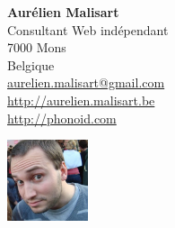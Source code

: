 \noindent\begin{minipage}[c]{.7\linewidth}
  \begin{flushleft}
    \noindent\textbf{\Large Aurélien Malisart}\\
    Consultant Web indépendant\\
    7000 Mons\\
    Belgique\\
    \vspace{0.5cm}
    \href{mailto:aurelien.malisart@gmail.com}{aurelien.malisart@gmail.com}\\
    \url{http://aurelien.malisart.be}\\
    \url{http://phonoid.com}
  \end{flushleft}
\end{minipage}
\begin{minipage}[c]{.3\linewidth}
  \begin{flushright}
    \noindent
    \includegraphics[height=90px]{photo}
  \end{flushright}
\end{minipage}
